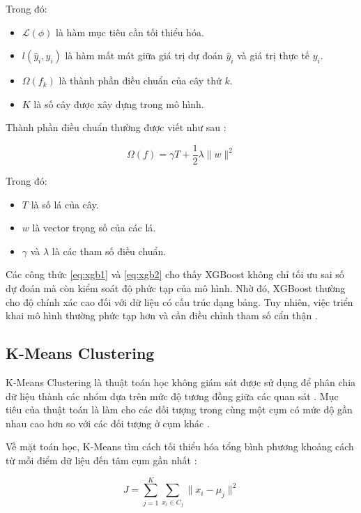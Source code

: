 Trong đó:
\begin{itemize}
    \item \(\mathcal{L}(\phi)\) là hàm mục tiêu cần tối thiểu hóa.
    \item \(l(\hat{y}_i, y_i)\) là hàm mất mát giữa giá trị dự đoán \(\hat{y}_i\) và giá trị thực tế \(y_i\).
    \item \(\Omega(f_k)\) là thành phần điều chuẩn của cây thứ \(k\).
    \item \(K\) là số cây được xây dựng trong mô hình.
\end{itemize}

Thành phần điều chuẩn thường được viết như sau \cite{chen2016xgboost}:

\begin{equation}
\Omega(f) = \gamma T + \frac{1}{2}\lambda \|w\|^2
\label{eq:xgb2}
\end{equation}

Trong đó:
\begin{itemize}
    \item \(T\) là số lá của cây.
    \item \(w\) là vector trọng số của các lá.
    \item \(\gamma\) và \(\lambda\) là các tham số điều chuẩn.
\end{itemize}

Các công thức \eqref{eq:xgb1} và \eqref{eq:xgb2} cho thấy XGBoost không chỉ tối ưu sai số dự đoán mà còn kiểm soát độ phức tạp của mô hình. Nhờ đó, XGBoost thường cho độ chính xác cao đối với dữ liệu có cấu trúc dạng bảng. Tuy nhiên, việc triển khai mô hình thường phức tạp hơn và cần điều chỉnh tham số cẩn thận \cite{chen2016xgboost}.

\subsection*{\thesubsection\quad K-Means Clustering}

K-Means Clustering là thuật toán học không giám sát được sử dụng để phân chia dữ liệu thành các nhóm dựa trên mức độ tương đồng giữa các quan sát \cite{sklearn_kmeans}. Mục tiêu của thuật toán là làm cho các đối tượng trong cùng một cụm có mức độ gần nhau cao hơn so với các đối tượng ở cụm khác \cite{sklearn_kmeans}.

Về mặt toán học, K-Means tìm cách tối thiểu hóa tổng bình phương khoảng cách từ mỗi điểm dữ liệu đến tâm cụm gần nhất \cite{sklearn_kmeans}:

\begin{equation}
J = \sum_{j=1}^{K} \sum_{x_i \in C_j} \|x_i - \mu_j\|^2
\label{eq:kmeans1}
\end{equation}

